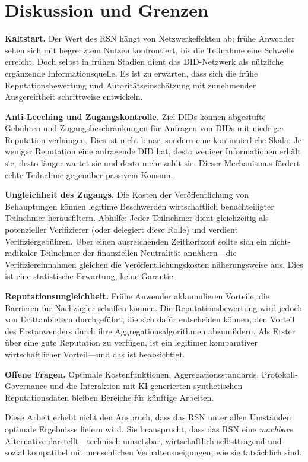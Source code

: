 \documentclass[11pt,a4paper,twocolumn]{article}
\begin{document}
\section{Diskussion und Grenzen}

\textbf{Kaltstart.} Der Wert des RSN hängt von Netzwerkeffekten ab; frühe Anwender sehen sich mit begrenztem Nutzen konfrontiert, bis die Teilnahme eine Schwelle erreicht. Doch selbst in frühen Stadien dient das DID-Netzwerk als nützliche ergänzende Informationsquelle. Es ist zu erwarten, dass sich die frühe Reputationsbewertung und Autoritätseinschätzung mit zunehmender Ausgereiftheit schrittweise entwickeln.

\textbf{Anti-Leeching und Zugangskontrolle.} Ziel-DIDs können abgestufte Gebühren und Zugangsbeschränkungen für Anfragen von DIDs mit niedriger Reputation verhängen. Dies ist nicht binär, sondern eine kontinuierliche Skala: Je weniger Reputation eine anfragende DID hat, desto weniger Informationen erhält sie, desto länger wartet sie und desto mehr zahlt sie. Dieser Mechanismus fördert echte Teilnahme gegenüber passivem Konsum.

\textbf{Ungleichheit des Zugangs.} Die Kosten der Veröffentlichung von Behauptungen können legitime Beschwerden wirtschaftlich benachteiligter Teilnehmer herausfiltern. Abhilfe: Jeder Teilnehmer dient gleichzeitig als potenzieller Verifizierer (oder delegiert diese Rolle) und verdient Verifiziergebühren. Über einen ausreichenden Zeithorizont sollte sich ein nicht-radikaler Teilnehmer der finanziellen Neutralität annähern---die Verifiziereinnahmen gleichen die Veröffentlichungskosten näherungsweise aus. Dies ist eine statistische Erwartung, keine Garantie.

\textbf{Reputationsungleichheit.} Frühe Anwender akkumulieren Vorteile, die Barrieren für Nachzügler schaffen können. Die Reputationsbewertung wird jedoch von Drittanbietern durchgeführt, die sich dafür entscheiden können, den Vorteil des Erstanwenders durch ihre Aggregationsalgorithmen abzumildern. Als Erster über eine gute Reputation zu verfügen, ist ein legitimer komparativer wirtschaftlicher Vorteil---und das ist beabsichtigt.

\textbf{Offene Fragen.} Optimale Kostenfunktionen, Aggregationsstandards, Protokoll-Governance und die Interaktion mit KI-generierten synthetischen Reputationsdaten bleiben Bereiche für künftige Arbeiten.

Diese Arbeit erhebt nicht den Anspruch, dass das RSN unter allen Umständen optimale Ergebnisse liefern wird. Sie beansprucht, dass das RSN eine \emph{machbare} Alternative darstellt---technisch umsetzbar, wirtschaftlich selbsttragend und sozial kompatibel mit menschlichen Verhaltensneigungen, wie sie tatsächlich sind.
\end{document}
